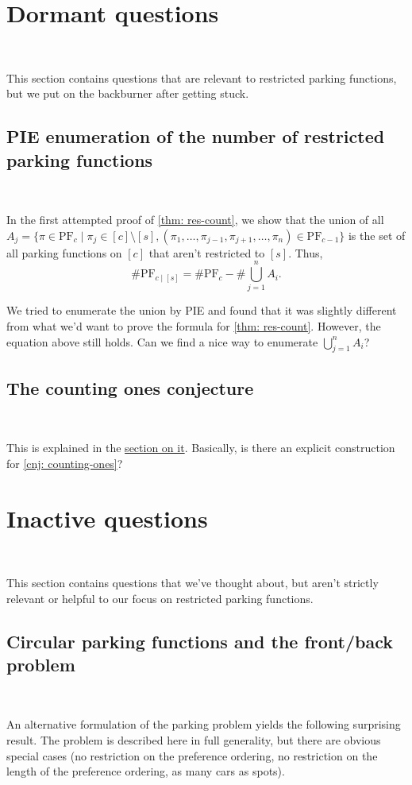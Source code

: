 \section{Dormant questions}~

This section contains questions that are relevant to restricted parking functions, but we put on the backburner after getting stuck.

\subsection*{PIE enumeration of the number of restricted parking functions}~

In the first attempted proof of \cref{thm: res-count}, we show that the union of all $A_{j} = \{ \pi \in \mathrm{PF}_{c} \mid \pi_{j} \in [c] \setminus [s], (\pi_{1}, \dots, \pi_{j - 1}, \pi_{j + 1}, \dots, \pi_{n}) \in \mathrm{PF}_{c - 1} \}$ is the set of all parking functions on $[c]$ that aren't restricted to $[s]$. Thus,
\[
	\# \mathrm{PF}_{c \mid [s]} = \# \mathrm{PF}_{c} - \# \bigcup_{j = 1}^{n} A_{i}.
\]

We tried to enumerate the union by PIE and found that it was slightly different from what we'd want to prove the formula for \cref{thm: res-count}. However, the equation above still holds. Can we find a nice way to enumerate $\bigcup_{j = 1}^{n} A_{i}$?

\subsection*{The counting ones conjecture}~

This is explained in the \hyperref[sss: no.ones]{section on it}. Basically, is there an explicit construction for \cref{cnj: counting-ones}?

\pagebreak

\section{Inactive questions}~

This section contains questions that we've thought about, but aren't strictly relevant or helpful to our focus on restricted parking functions.

\subsection*{Circular parking functions and the front/back problem}~

An alternative formulation of the parking problem yields the following surprising result. The problem is described here in full generality, but there are obvious special cases (no restriction on the preference ordering, no restriction on the length of the preference ordering, as many cars as spots). \\

